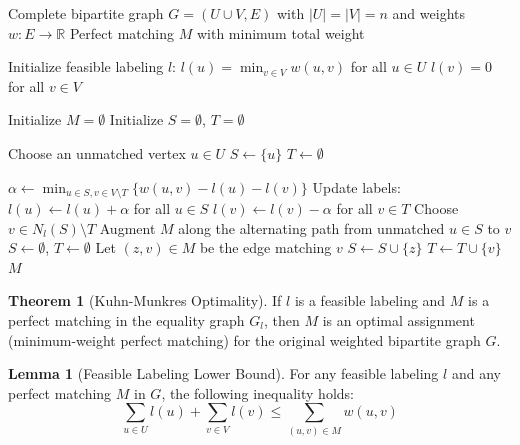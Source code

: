 \documentclass{article}
\theoremstyle{definition}
\newtheorem{theorem}{Theorem}
\newtheorem{lemma}{Lemma}
\begin{document}
\begin{algorithm}
\caption{Kuhn-Munkres Algorithm}
\begin{algorithmic}[1]
\Require Complete bipartite graph $G = (U \cup V, E)$ with $|U| = |V| = n$ and weights $w: E \rightarrow \mathbb{R}$
\Ensure Perfect matching $M$ with minimum total weight

\State Initialize feasible labeling $l$:
\State $l(u) = \min_{v \in V} w(u,v)$ for all $u \in U$
\State $l(v) = 0$ for all $v \in V$

\State Initialize $M = \emptyset$ 
\State Initialize $S = \emptyset$, $T = \emptyset$ 

 
        \State Choose an unmatched vertex $u \in U$
        \State $S \gets \{u\}$
        \State $T \gets \emptyset$
    \EndIf
    
     
        \State $\alpha \gets \min_{u \in S, v \in V \setminus T} \{w(u,v) - l(u) - l(v)\}$ 
        \State Update labels:
        \State $l(u) \gets l(u) + \alpha$ for all $u \in S$
        \State $l(v) \gets l(v) - \alpha$ for all $v \in T$
    \Else
        \State Choose $v \in N_l(S) \setminus T$
            \State Augment $M$ along the alternating path from unmatched $u \in S$ to $v$
            \State $S \gets \emptyset$, $T \gets \emptyset$ 
        \Else
            \State Let $(z, v) \in M$ be the edge matching $v$
            \State $S \gets S \cup \{z\}$
            \State $T \gets T \cup \{v\}$
        \EndIf
    \EndIf
\EndWhile
\State \Return $M$
\end{algorithmic}
\end{algorithm}
\begin{theorem}[Kuhn-Munkres Optimality]
If $l$ is a feasible labeling and $M$ is a perfect matching in the equality graph $G_l$, then $M$ is an optimal assignment (minimum-weight perfect matching) for the original weighted bipartite graph $G$.
\end{theorem}
\begin{lemma}[Feasible Labeling Lower Bound]
For any feasible labeling $l$ and any perfect matching $M$ in $G$, the following inequality holds:
\begin{equation}
\sum_{u \in U} l(u) + \sum_{v \in V} l(v) \leq \sum_{(u,v) \in M} w(u,v)
\end{equation}
\end{lemma}
\end{document}
